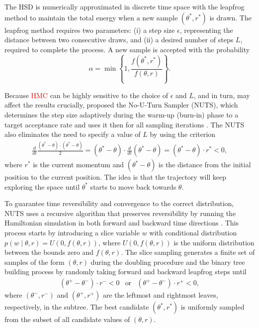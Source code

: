 \documentclass[a4paper]{article}   	%
\begin{document}
	The HSD is numerically approximated in discrete time space with the leapfrog method to maintain the total energy when a new sample $(\theta^*,r^*)$ is drawn. The leapfrog method requires two parameters: (i) a step size $\epsilon$, representing the distance between two consecutive draws, and (ii) a desired number of steps $L$, required to complete the process. A new sample is accepted with the probability 
	\begin{equation}
		\alpha = \min \left\{ 1, \frac{f(\theta^*,r^*)}{ f(\theta,r)} \right\}. 
	\end{equation}
	
	Because \textcolor{red}{HMC} can be highly sensitive to the choice of $\epsilon$ and $L$, and in turn, may affect the results crucially, \textcite{Hoffman2014NoUturn} proposed the No-U-Turn Sampler (NUTS), which determines the step size adaptively during the warm-up (burn-in) phase to a target acceptance rate and uses it then for all sampling iterations \parencite{Monnahan2017Faster}. The NUTS also eliminates the need to specify a value of $L$ by using the criterion 
	\begin{eqnarray}
		\frac{d}{dt}\frac{(\theta^*-\theta)\cdot(\theta^*-\theta)}{2}=(\theta^*-\theta)\cdot\frac{d}{dt}(\theta^*-\theta)=(\theta^*-\theta)\cdot r^* <0,
	\end{eqnarray}
	where $r^*$ is the current momentum and $(\theta^*-\theta)$ is the distance from the initial position to the current position. The idea is that the trajectory will keep exploring the space until $\theta^*$ starts to move back towards $\theta$. 
	
	
	To guarantee time reversibility and convergence to the correct distribution, NUTS uses a recursive algorithm that preserves reversibility by running the Hamiltonian simulation in both forward and backward time directions \parencite{Hoffman2014NoUturn}. This process starts by introducing a slice variable $w$ with conditional distribution $p(w\mid\theta, r) = U(0,f(\theta,r) )$, where $U(0,f(\theta,r))$ is the uniform distribution between the bounds zero and $f(\theta,r)$. The slice sampling generates a finite set of samples of the form $(\theta,r)$ during the doubling procedure and the binary tree building process by randomly taking forward and backward leapfrog steps until 
	\begin{equation}
		\begin{matrix}
			(\theta^+-\theta^-)\cdot r^- <0 & \mbox{or} & (\theta^+-\theta^-)\cdot r^+ <0,
		\end{matrix}
	\end{equation}
	where $(\theta^-, r^-)$ and $(\theta^+, r^+)$ are the leftmost and rightmost leaves, respectively, in the subtree. The best candidate $(\theta^*,r^*)$ is uniformly sampled from the subset of all candidate values of $(\theta,r)$. 
	
\end{document}
